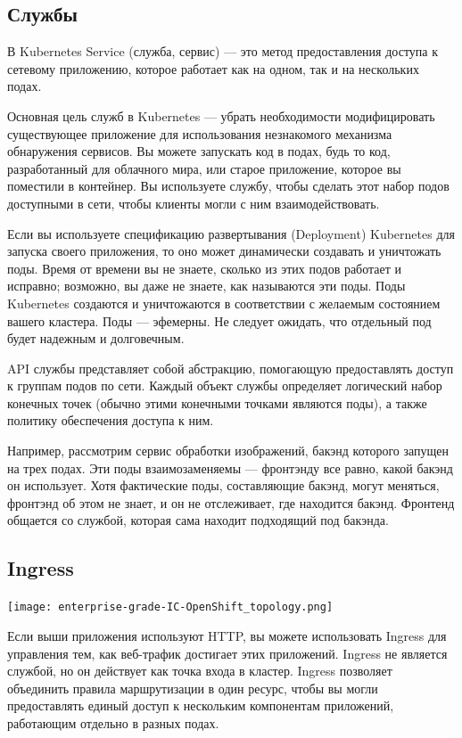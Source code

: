 \documentclass[a4page]{article}
\begin{document}
\subsection{Службы}
В Kubernetes Service (служба, сервис) --- это метод предоставления доступа к сетевому приложению, которое работает как на одном, так и на нескольких подах\cite{k8s:service}.

Основная цель служб в Kubernetes --- убрать необходимости модифицировать существующее приложение для использования незнакомого механизма обнаружения сервисов. Вы можете запускать код в подах, будь то код, разработанный для облачного мира, или старое приложение, которое вы поместили в контейнер. Вы используете службу, чтобы сделать этот набор подов доступными в сети, чтобы клиенты могли с ним взаимодействовать.

Если вы используете спецификацию развертывания (Deployment) Kubernetes для запуска своего приложения, то оно может динамически создавать и уничтожать поды. Время от времени вы не знаете, сколько из этих подов работает и исправно; возможно, вы даже не знаете, как называются эти поды. Поды Kubernetes создаются и уничтожаются в соответствии с желаемым состоянием вашего кластера. Поды --- эфемерны. Не следует ожидать, что отдельный под будет надежным и долговечным.

API службы представляет собой абстракцию, помогающую предоставлять доступ к группам подов по сети. Каждый объект службы определяет логический набор конечных точек (обычно этими конечными точками являются поды), а также политику обеспечения доступа к ним.

Например, рассмотрим сервис обработки изображений, бакэнд которого запущен на трех подах. Эти поды взаимозаменяемы --- фронтэнду все равно, какой бакэнд он использует. Хотя фактические поды, составляющие бакэнд, могут меняться, фронтэнд об этом не знает, и он не отслеживает, где находится бакэнд. Фронтенд общается со службой, которая сама находит подходящий под бакэнда.

\subsection{Ingress}
\texttt{[image: enterprise-grade-IC-OpenShift\_topology.png]}

Если выши приложения используют HTTP, вы можете использовать Ingress для управления тем, как веб-трафик достигает этих приложений. Ingress не является службой, но он действует как точка входа в кластер. Ingress позволяет объединить правила маршрутизации в один ресурс, чтобы вы могли предоставлять единый доступ к нескольким компонентам приложений, работающим отдельно в разных подах.
\end{document}
